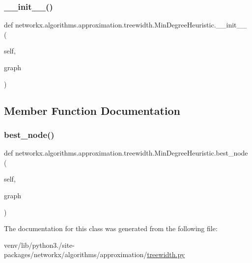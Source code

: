 \subsubsection{\texorpdfstring{\+\_\+\+\_\+init\+\_\+\+\_\+()}{\_\_init\_\_()}}
{\footnotesize\ttfamily def networkx.\+algorithms.\+approximation.\+treewidth.\+Min\+Degree\+Heuristic.\+\_\+\+\_\+init\+\_\+\+\_\+ (\begin{DoxyParamCaption}\item[{}]{self,  }\item[{}]{graph }\end{DoxyParamCaption})}



\subsection{Member Function Documentation}
\mbox{\label{classnetworkx_1_1algorithms_1_1approximation_1_1treewidth_1_1MinDegreeHeuristic_abc778375ae488ddc978e555a7eba00d4}} 
\subsubsection{\texorpdfstring{best\+\_\+node()}{best\_node()}}
{\footnotesize\ttfamily def networkx.\+algorithms.\+approximation.\+treewidth.\+Min\+Degree\+Heuristic.\+best\+\_\+node (\begin{DoxyParamCaption}\item[{}]{self,  }\item[{}]{graph }\end{DoxyParamCaption})}



The documentation for this class was generated from the following file\+:\begin{DoxyCompactItemize}
\item 
venv/lib/python3./site-\/packages/networkx/algorithms/approximation/\hyperlink{treewidth_8py}{treewidth.\+py}\end{DoxyCompactItemize}
